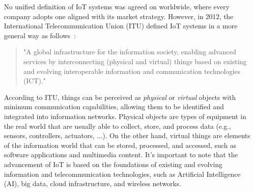 \documentclass[]{IEEEtran}
\begin{document}
No unified definition of IoT systems was agreed on worldwide, where every company adopts one aligned with its market strategy.
However, in 2012, the International Telecommunication Union (ITU) defined IoT systems in a more general way as follows~\cite{itu-t_overview_2012_Y.2060}:
\begin{quote}
"A global infrastructure for the information society, enabling advanced services by interconnecting (physical and virtual) things based on existing and evolving interoperable information and communication technologies (ICT)."
\end{quote}
According to ITU, things can be perceived as \textit{physical} or \textit{virtual} objects with minimum communication capabilities, allowing them to be identified and integrated into information networks.
Physical objects are types of equipment in the real world that are usually able to collect, store, and process data (e.g., sensors, controllers, actuators, ...).
On the other hand, virtual things are elements of the information world that can be stored, processed, and accessed, such as software applications and multimedia content.
It's important to note that the advancement of IoT is based on the foundations of existing and evolving information and telecommunication technologies, such as Artificial Intelligence (AI), big data, cloud infrastructure, and wireless networks.
\end{document}
